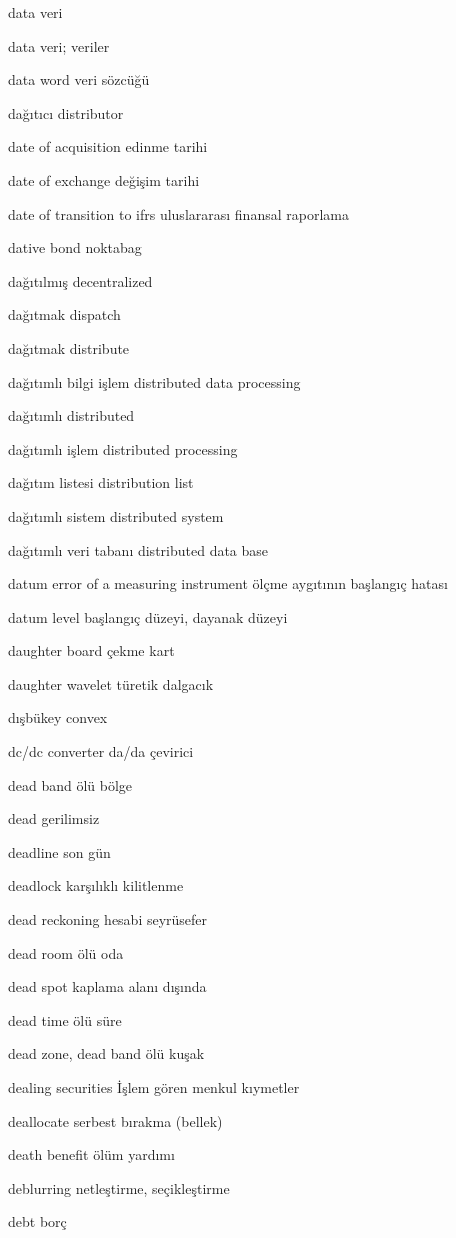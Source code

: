 \documentclass[12pt,fleqn]{article}\usepackage{../../common}
\begin{document}
data veri

data veri; veriler

data word veri sözcüğü

dağıtıcı distributor

date of acquisition edinme tarihi

date of exchange değişim tarihi

date of transition to ifrs uluslararası finansal raporlama

dative bond noktabag

dağıtılmış decentralized

dağıtmak dispatch

dağıtmak distribute

dağıtımlı bilgi işlem distributed data processing

dağıtımlı distributed

dağıtımlı işlem distributed processing

dağıtım listesi distribution list

dağıtımlı sistem distributed system

dağıtımlı veri tabanı distributed data base

datum error of a measuring instrument ölçme aygıtının başlangıç hatası

datum level başlangıç düzeyi, dayanak düzeyi

daughter board çekme kart

daughter wavelet türetik dalgacık

dışbükey convex

dc/dc converter da/da çevirici

dead band ölü bölge

dead gerilimsiz

deadline son gün

deadlock karşılıklı kilitlenme

dead reckoning hesabi seyrüsefer

dead room ölü oda

dead spot kaplama alanı dışında

dead time ölü süre

dead zone, dead band ölü kuşak

dealing securities İşlem gören menkul kıymetler

deallocate serbest bırakma (bellek)

death benefit ölüm yardımı

deblurring netleştirme, seçikleştirme

debt borç
\end{document}
